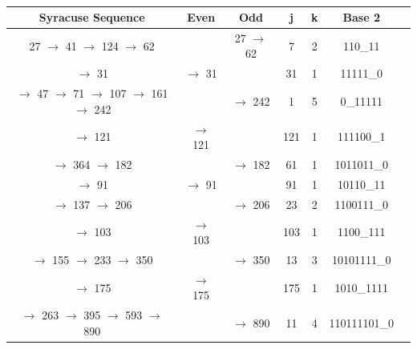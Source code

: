 \documentclass[letterpaper]{article}
\begin{document}
\begin{multicols}{2}
    \begin{table}[ht]
        \centering
        \begin{tabular}{|c|c|c|c|c|c|c|}
            \hline
            \textbf{Syracuse Sequence}                      & \textbf{Even} & \textbf{Odd} & \textbf{j} & \textbf{k} & \textbf{Base 2} \\
            \hline
            27 $\to$ 41 $\to$ 124 $\to$ 62                  &               & 27 $\to$ 62  & 7          & 2          & 110\_11         \\
            \hline
            $\to$ 31                                        & $\to$ 31      &              & 31         & 1          & 11111\_0        \\
            \hline
            $\to$ 47 $\to$ 71 $\to$ 107 $\to$ 161 $\to$ 242 &               & $\to$ 242    & 1          & 5          & 0\_11111        \\
            \hline
            $\to$ 121                                       & $\to$ 121     &              & 121        & 1          & 111100\_1       \\
            \hline
            $\to$ 364 $\to$ 182                             &               & $\to$ 182    & 61         & 1          & 1011011\_0      \\
            \hline
            $\to$ 91                                        & $\to$ 91      &              & 91         & 1          & 10110\_11       \\
            \hline
            $\to$ 137 $\to$ 206                             &               & $\to$ 206    & 23         & 2          & 1100111\_0      \\
            \hline
            $\to$ 103                                       & $\to$ 103     &              & 103        & 1          & 1100\_111       \\
            \hline
            $\to$ 155 $\to$ 233 $\to$ 350                   &               & $\to$ 350    & 13         & 3          & 10101111\_0     \\
            \hline
            $\to$ 175                                       & $\to$ 175     &              & 175        & 1          & 1010\_1111      \\
            \hline
            $\to$ 263 $\to$ 395 $\to$ 593 $\to$ 890         &               & $\to$ 890    & 11         & 4          & 110111101\_0    \\
            \hline
        \end{tabular}
        \caption{}
    \end{table}


\end{multicols}
\end{document}
